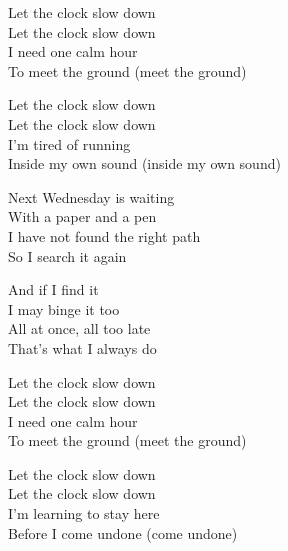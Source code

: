 \begin{lyrics}
Let the clock slow down\\
Let the clock slow down\\
I need one calm hour\\
To meet the ground (meet the ground)

Let the clock slow down\\
Let the clock slow down\\
I’m tired of running\\
Inside my own sound (inside my own sound)

Next Wednesday is waiting\\
With a paper and a pen\\
I have not found the right path\\
So I search it again

And if I find it\\
I may binge it too\\
All at once, all too late\\
That’s what I always do

Let the clock slow down\\
Let the clock slow down\\
I need one calm hour\\
To meet the ground (meet the ground)

Let the clock slow down\\
Let the clock slow down\\
I’m learning to stay here\\
Before I come undone (come undone)
\end{lyrics}

